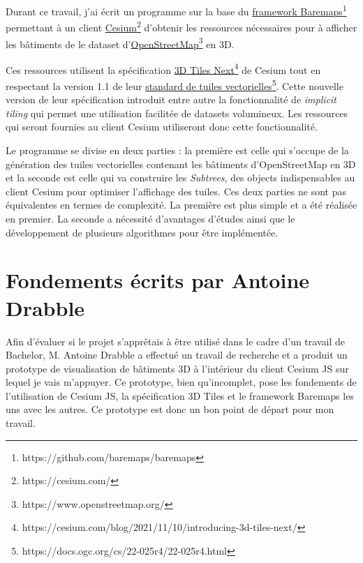 
Durant ce travail, j'ai écrit un programme sur la base du \href{https://github.com/baremaps/baremaps}{framework Baremaps}\footnote{https://github.com/baremaps/baremaps} permettant à un client \href{https://cesium.com/}{Cesium}\footnote{https://cesium.com/} d'obtenir les ressources nécessaires pour à afficher les bâtiments de le dataset d'\href{https://www.openstreetmap.org/}{OpenStreetMap}\footnote{https://www.openstreetmap.org/} en 3D.

Ces ressources utilisent la spécification \href{https://cesium.com/blog/2021/11/10/introducing-3d-tiles-next/}{3D Tiles Next}\footnote{https://cesium.com/blog/2021/11/10/introducing-3d-tiles-next/} de Cesium tout en respectant la version 1.1 de leur \href{https://docs.ogc.org/cs/22-025r4/22-025r4.html}{standard de tuiles vectorielles}\footnote{https://docs.ogc.org/cs/22-025r4/22-025r4.html}. Cette nouvelle version de leur spécification introduit entre autre la fonctionnalité de \textit{implicit tiling} \cite{implicit-tiling-gh} qui permet une utilisation facilitée de datasets volumineux. Les ressources qui seront fournies au client Cesium utiliseront donc cette fonctionnalité.

Le programme se divise en deux parties : la première est celle qui s'occupe de la génération des tuiles vectorielles contenant les bâtiments d'OpenStreetMap en 3D et la seconde est celle qui va construire les \textit{Subtrees}, des objects indispensables au client Cesium pour optimiser l'affichage des tuiles. Ces deux parties ne sont pas équivalentes en termes de complexité. La première est plus simple et a été réalisée en premier. La seconde a nécessité d'avantages d'études ainsi que le développement de plusieurs algorithmes pour être implémentée.

\newpage
\section*{Fondements écrits par Antoine Drabble}

Afin d'évaluer si le projet s'apprêtais à être utilisé dans le cadre d'un travail de Bachelor, M. Antoine Drabble a effectué un travail de recherche et a produit un prototype de visualisation de bâtiments 3D à l'intérieur du client Cesium JS sur lequel je vais m'appuyer. Ce prototype, bien qu'incomplet, pose les fondements de l'utilisation de Cesium JS, la spécification 3D Tiles et le framework Baremaps les uns avec les autres. Ce prototype est donc un bon point de départ pour mon travail.

